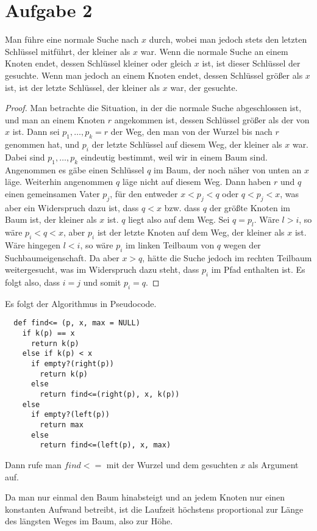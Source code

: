 \documentclass[10pt,a4paper]{article}
\begin{document}
\section{Aufgabe 2}
Man führe eine normale Suche nach $x$ durch, wobei man jedoch stets den letzten Schlüssel mitführt, der kleiner als $x$ war.
Wenn die normale Suche an einem Knoten endet, dessen Schlüssel kleiner oder gleich $x$ ist, ist dieser Schlüssel der gesuchte.
Wenn man jedoch an einem Knoten endet, dessen Schlüssel größer als $x$ ist, ist der letzte Schlüssel, der kleiner als $x$ war, der gesuchte.
\begin{proof}
  Man betrachte die Situation, in der die normale Suche abgeschlossen ist, und man an einem Knoten $r$ angekommen ist, dessen Schlüssel größer als der von $x$ ist.
  Dann sei $p_{1}, \dots, p_{k} = r$ der Weg, den man von der Wurzel bis nach $r$ genommen hat, und $p_{i}$ der letzte Schlüssel auf diesem Weg, der kleiner als $x$ war.
  Dabei sind $p_{1}, \dots, p_{k}$ eindeutig bestimmt, weil wir in einem Baum sind.
  Angenommen es gäbe einen Schlüssel $q$ im Baum, der noch näher von unten an $x$ läge.
  Weiterhin angenommen $q$ läge nicht auf diesem Weg.
  Dann haben $r$ und $q$ einen gemeinsamen Vater $p_{j}$, für den entweder $x < p_{j} < q$ oder $q < p_{j} < x$, was aber ein Widerspruch dazu ist, dass $q < x$ bzw. dass $q$ der größte Knoten im Baum ist, der kleiner als $x$ ist.
  $q$ liegt also auf dem Weg.
  Sei $q = p_{l}$.
  Wäre $l > i$, so wäre $p_{i} < q < x$, aber $p_{i}$ ist der letzte Knoten auf dem Weg, der kleiner als $x$ ist.
  Wäre hingegen $l < i$, so wäre $p_{i}$ im linken Teilbaum von $q$ wegen der Suchbaumeigenschaft.
  Da aber $x > q$, hätte die Suche jedoch im rechten Teilbaum weitergesucht, was im Widerspruch dazu steht, dass $p_{i}$ im Pfad enthalten ist.
  Es folgt also, dass $i = j$ und somit $p_{i} = q$.
\end{proof}
Es folgt der Algorithmus in Pseudocode.
\begin{lstlisting}
  def find<= (p, x, max = NULL)
    if k(p) == x
      return k(p)
    else if k(p) < x
      if empty?(right(p))
        return k(p)
      else
        return find<=(right(p), x, k(p))
    else
      if empty?(left(p))
        return max
      else
        return find<=(left(p), x, max)
\end{lstlisting}
Dann rufe man $find<=$ mit der Wurzel und dem gesuchten $x$ als Argument auf.

Da man nur einmal den Baum hinabsteigt und an jedem Knoten nur einen konstanten Aufwand betreibt, ist die Laufzeit höchstens proportional zur Länge des längsten Weges im Baum, also zur Höhe.
\end{document}
